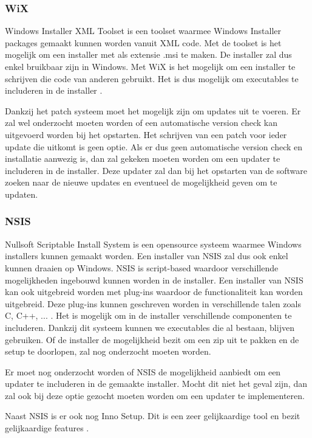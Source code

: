 \documentclass{article}
\begin{document}
\subsubsection{WiX \citep{wixMain}}
Windows Installer XML Toolset is een toolset waarmee Windows Installer packages gemaakt kunnen worden vanuit XML code.
Met de toolset is het mogelijk om een installer met als extensie .msi te maken.
De installer zal dus enkel bruikbaar zijn in Windows.
Met WiX is het mogelijk om een installer te schrijven die code van anderen gebruikt.
Het is dus mogelijk om executables te includeren in de installer \citep{wixMergers}.

Dankzij het patch systeem moet het mogelijk zijn om updates uit te voeren.
Er zal wel onderzocht moeten worden of een automatische version check kan uitgevoerd worden bij het opstarten.
Het schrijven van een patch voor ieder update die uitkomt is geen optie.
Als er dus geen automatische version check en installatie aanwezig is, dan zal gekeken moeten worden om een updater te includeren in de installer.
Deze updater zal dan bij het opstarten van de software zoeken naar de nieuwe updates en eventueel de mogelijkheid geven om te updaten.

\subsubsection{NSIS \citep{nsisMain}}
Nullsoft Scriptable Install System is een opensource systeem waarmee Windows installers kunnen gemaakt worden.
Een installer van NSIS zal dus ook enkel kunnen draaien op Windows.
NSIS is script-based waardoor verschillende mogelijkheden ingebouwd kunnen worden in de installer.
Een installer van NSIS kan ook uitgebreid worden met plug-ins waardoor de functionaliteit kan worden uitgebreid.
Deze plug-ins kunnen geschreven worden in verschillende talen zoals C, C++, ... \citep{nsisFeatures}.
Het is mogelijk om in de installer verschillende componenten te includeren.
Dankzij dit systeem kunnen we executables die al bestaan, blijven gebruiken.
Of de installer de mogelijkheid bezit om een zip uit te pakken en de setup te doorlopen, zal nog onderzocht moeten worden.

Er moet nog onderzocht worden of NSIS de mogelijkheid aanbiedt om een updater te includeren in de gemaakte installer.
Mocht dit niet het geval zijn, dan zal ook bij deze optie gezocht moeten worden om een updater te implementeren.

Naast NSIS is er ook nog Inno Setup.
Dit is een zeer gelijkaardige tool en bezit gelijkaardige features \citep{innosetupMain}.
\end{document}
